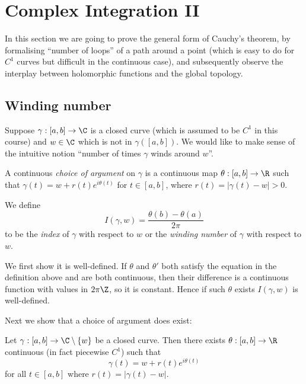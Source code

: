 \documentclass[a4paper]{article}
\begin{document}
\section{Complex Integration II}

In this section we are going to prove the general form of Cauchy's theorem, by formalising ``number of loops'' of a path around a point (which is easy to do for \(C^1\) curves but difficult in the continuous case), and subsequently observe the interplay between holomorphic functions and the global topology.

\subsection{Winding number}

Suppose \(\gamma: [a, b] \to \C\) is a closed curve (which is assumed to be \(C^1\) in this course) and \(w \in \C\) which is not in \(\gamma([a, b])\). We would like to make sense of the intuitive notion ``number of times \(\gamma\) winds around \(w\)''.

\begin{definition}
  A continuous \emph{choice of argument} on \(\gamma\) is a continuous map \(\theta: [a, b] \to \R\) such that \(\gamma(t) = w + r(t)e^{i\theta(t)}\) for \(t \in [a, b]\), where \(r(t) = |\gamma(t) - w| > 0\).
\end{definition}

\begin{definition}
  We define
  \[
    I(\gamma, w) = \frac{\theta(b) - \theta(a)}{2\pi}
  \]
  to be the \emph{index} of \(\gamma\) with respect to \(w\) or the \emph{winding number} of \(\gamma\) with respect to \(w\).
\end{definition}

We first show it is well-defined. If \(\theta\) and \(\theta'\) both satisfy the equation in the definition above and are both continuous, then their difference is a continuous function with values in \(2\pi\Z\), so it is constant. Hence if such \(\theta\) exists \(I(\gamma, w)\) is well-defined.

Next we show that a choice of argument does exist:

\begin{lemma}
  Let \(\gamma: [a, b] \to \C \setminus \{w\}\) be a closed curve. Then there exists \(\theta: [a, b] \to \R\) continuous (in fact piecewise \(C^1\)) such that
  \[
    \gamma(t) = w + r(t) e^{i\theta(t)}
  \]
  for all \(t \in [a, b]\) where \(r(t) = |\gamma(t) - w|\).
\end{lemma}
\end{document}

